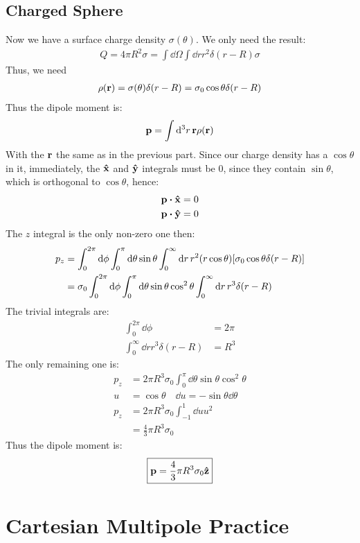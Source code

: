 \documentclass[12pt]{article}
\begin{document}
\subsection{Charged Sphere}
Now we have a surface charge density $\sigma(\theta)$. We only need the result:
\begin{align*}
  Q=4\pi R^2\sigma=\int\dd{\Omega}\int\dd{r}r^2\delta(r-R)\sigma
\end{align*}
Thus, we need 
\begin{align*}
  \rho(\vb{r})=\sigma(\theta)\delta(r-R)=\sigma_0\cos\theta\delta(r-R)
\end{align*}
Thus the dipole moment is:
\begin{align*}
  \vb{p}=\int\dd[3]{r}\vb{r}\rho(\vb{r})
\end{align*}
With the $\vb{r}$ the same as in the previous part. Since our charge density has a $\cos\theta$ in it, immediately, the $\vu{x}$ and $\vu{y}$ integrals must be $0$, since they contain $\sin\theta$, which is orthogonal to $\cos\theta$, hence:
\begin{align*}
  \vb{p}\vdot\vu{x}&=0\\
  \vb{p}\vdot\vu{y}&=0
\end{align*}
The $z$ integral is the only non-zero one then:
\begin{align*}
  p_z&=\int_0^{2\pi}\dd{\phi}\int_0^\pi\dd{\theta}\sin\theta\int_0^\infty\dd{r}r^2
  \qty(r\cos\theta)\qty[\sigma_0\cos\theta\delta(r-R)]\\
  &=\sigma_0\int_0^{2\pi}\dd{\phi}
  \int_0^\pi\dd{\theta}\sin\theta\cos^2\theta
  \int_0^\infty\dd{r}r^3\delta(r-R)
\end{align*}
The trivial integrals are:
\begin{align*}
  \int_0^{2\pi}\dd{\phi}&=2\pi\\
  \int_0^\infty\dd{r}r^3\delta(r-R)&=R^3
\end{align*}
The only remaining one is:
\begin{align*}
  p_z&=2\pi R^3\sigma_0\int_0^\pi\dd{\theta}\sin\theta\cos^2\theta\\
  u&=\cos\theta\quad\dd{u}=-\sin\theta\dd{\theta}\\
  p_z&=2\pi R^3\sigma_0\int_{-1}^{1}\dd{u}u^2\\
  &=\frac43\pi R^3\sigma_0
\end{align*}
Thus the dipole moment is:
\begin{align}
  \boxed{\vb{p}=\frac43\pi R^3\sigma_0\vu{z}}
\end{align}
\section{Cartesian Multipole Practice}
\end{document}
